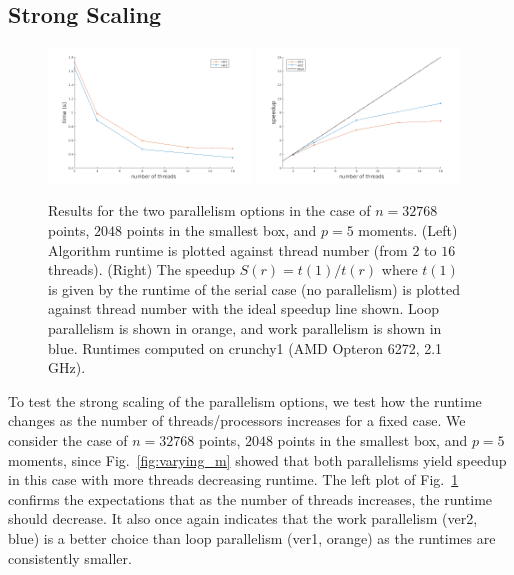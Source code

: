 \documentclass{article}
\begin{document}
\subsection{Strong Scaling}
\begin{figure}
  \centering
  \includegraphics[width=0.48\textwidth]{./figures/strong_scalability.png} %
  \includegraphics[width=0.48\textwidth]{./figures/strong_scalability2.png}
  \caption{Results for the two parallelism options in the case of $n=32768$ points, $2048$ points in the smallest box, and $p=5$ moments. (Left) Algorithm runtime is plotted against thread number (from $2$ to $16$ threads). (Right) The speedup $S(r) = t(1)/t(r)$ where $t(1)$ is given by the runtime of the serial case (no parallelism) is plotted against thread number with the ideal speedup line shown. Loop parallelism is shown in orange, and work parallelism is shown in blue. Runtimes computed on crunchy1 (AMD Opteron 6272, 2.1 GHz).}
  \label{fig:strong_scaling}
\end{figure}
To test the strong scaling of the parallelism options, we test how the runtime changes as the number of threads/processors increases for a fixed case. We consider the case of $n=32768$ points, $2048$ points in the smallest box, and $p=5$ moments, since Fig.~\ref{fig:varying_m} showed that both parallelisms yield speedup in this case with more threads decreasing runtime.  The left plot of Fig.~\ref{fig:strong_scaling} confirms the expectations that as the number of threads increases, the runtime should decrease. It also once again indicates that the work parallelism (ver2, blue) is a better choice than loop parallelism (ver1, orange) as the runtimes are consistently smaller.\\\\
\end{document}
